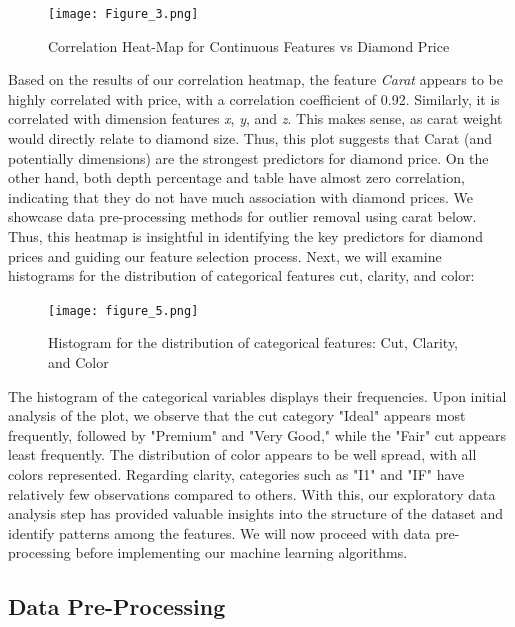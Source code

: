 \documentclass[conference]{IEEEtran}
\begin{document}
\begin{figure}[H]
    \centering
    \texttt{[image: Figure\_3.png]} %
    \caption{Correlation Heat-Map for Continuous Features vs Diamond Price}
    \label{fig:image_label}
\end{figure}

Based on the results of our correlation heatmap, the feature \emph{Carat} appears to be highly correlated with price, with a correlation coefficient of 0.92. Similarly, it is correlated with dimension features \emph{x}, \emph{y}, and \emph{z}. This makes sense, as carat weight would directly relate to diamond size. Thus, this plot suggests that Carat (and potentially dimensions) are the strongest predictors for diamond price. On the other hand, both depth percentage and table have almost zero correlation, indicating that they do not have much association with diamond prices. We showcase data pre-processing methods for outlier removal using carat below. Thus, this heatmap is insightful in identifying the key predictors for diamond prices and guiding our feature selection process. Next, we will examine histograms for the distribution of categorical features cut, clarity, and color:

\begin{figure}[H]
    \centering
    \texttt{[image: figure\_5.png]} %
    \caption{Histogram for the distribution of categorical features: Cut, Clarity, and Color }
    \label{fig:image_label}
\end{figure}

The histogram of the categorical variables displays their frequencies. Upon initial analysis of the plot, we observe that the cut category "Ideal" appears most frequently, followed by "Premium" and "Very Good," while the "Fair" cut appears least frequently. The distribution of color appears to be well spread, with all colors represented. Regarding clarity, categories such as "I1" and "IF" have relatively few observations compared to others. With this, our exploratory data analysis step has provided valuable insights into the structure of the dataset and identify patterns among the features. We will now proceed with data pre-processing before implementing our machine learning algorithms.

\subsection{Data Pre-Processing} 
\end{document}
